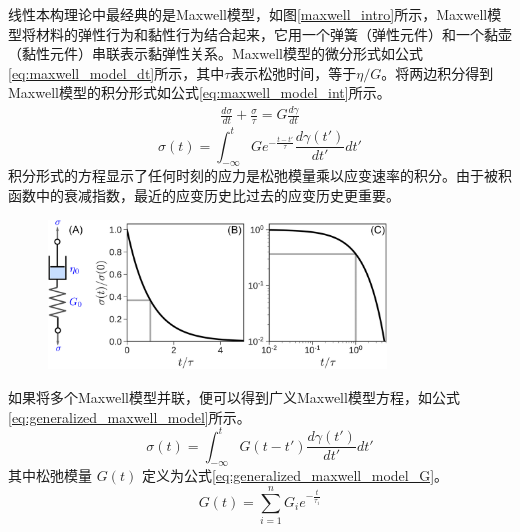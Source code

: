 线性本构理论中最经典的是Maxwell模型\cite{maxwell1867iv}，如图\ref{maxwell_intro}所示，Maxwell模型将材料的弹性行为和黏性行为结合起来，它用一个弹簧（弹性元件）和一个黏壶（黏性元件）串联表示黏弹性关系。Maxwell模型的微分形式如公式\eqref{eq:maxwell_model_dt}所示，其中$\tau$表示松弛时间，等于$\eta/G$。将两边积分得到Maxwell模型的积分形式如公式\eqref{eq:maxwell_model_int}所示。
\begin{gather}
  \frac{d\sigma}{dt} + \frac{\sigma}{\tau}  = G \frac{d\gamma}{dt} \label{eq:maxwell_model_dt}
\end{gather}
\begin{equation}
  \sigma(t)                                = \int_{-\infty}^{t} G e^{-\frac{t-t'}{\tau}} \frac{d\gamma(t')}{dt'} dt'\label{eq:maxwell_model_int}
\end{equation}
积分形式的方程显示了任何时刻的应力是松弛模量乘以应变速率的积分。由于被积函数中的衰减指数，最近的应变历史比过去的应变历史更重要。
\begin{figure}[htbp]
  \centering
  \includegraphics[width=0.8\textwidth]{Fig/maxwell_intro.png}
\end{figure}
如果将多个Maxwell模型并联，便可以得到广义Maxwell模型方程，如公式\eqref{eq:generalized_maxwell_model}所示。
\begin{equation}
  \sigma(t) = \int_{-\infty}^{t} G(t-t') \frac{d\gamma(t')}{dt'} dt' \label{eq:generalized_maxwell_model}
\end{equation}
其中松弛模量 \(G(t)\) 定义为公式\eqref{eq:generalized_maxwell_model_G}。
\begin{equation}
  G(t) = \sum_{i=1}^{n} G_i e^{-\frac{t}{\tau_i}} \label{eq:generalized_maxwell_model_G}
\end{equation}

